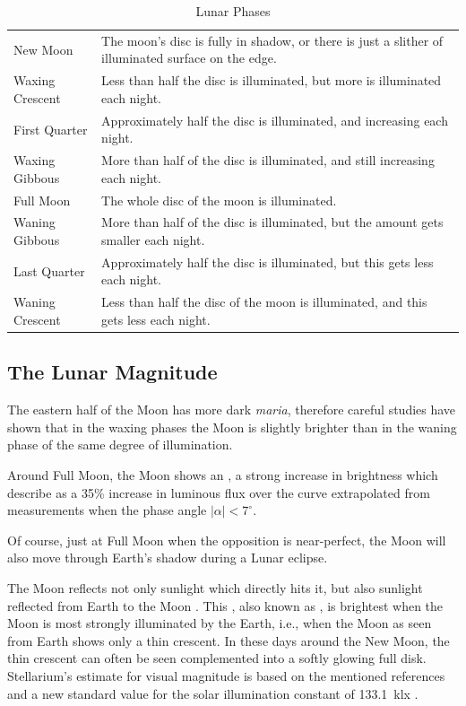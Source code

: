 \begin{table}[tb]
\small
\begin{tabularx}{\textwidth}{l|X}
\toprule
New Moon       & The moon's disc is fully in shadow, or there is just a slither of illuminated surface on the edge.\\
Waxing Crescent& Less than half the disc is illuminated, but more is illuminated each night.\\
First Quarter  & Approximately half the disc is illuminated, and increasing each night.\\
Waxing Gibbous & More than half of the disc is illuminated, and still increasing each night.\\
Full Moon      & The whole disc of the moon is illuminated.\\
Waning Gibbous & More than half of the disc is illuminated, but the amount gets smaller each night.\\
Last Quarter   & Approximately half the disc is illuminated, but this gets less each night.\\
Waning Crescent& Less than half the disc of the moon is illuminated, and this gets less each night.\\
\bottomrule
\end{tabularx}
\caption{Lunar Phases}
\label{tab:moonphases}
\end{table}

\subsection{The Lunar Magnitude}
\label{sec:Moon:magnitude}

The eastern half of the Moon has more dark \emph{maria}, therefore
careful studies \citep{Russell:1916} have shown that in the waxing
phases the Moon is slightly brighter than in the waning phase of the
same degree of illumination.

Around Full Moon, the Moon shows an , a
strong increase in brightness which \citet{Krisciunas-Schaefer:1991}
describe as a 35\% increase in luminous flux over the curve
extrapolated from measurements when the phase angle $|\alpha|<7^\circ$. 

Of course, just at Full Moon when the opposition is near-perfect, the
Moon will also move through Earth's shadow during a Lunar eclipse.

The Moon %
reflects not only sunlight
which directly hits it, but also sunlight reflected from Earth to the
Moon \citep{Agrawal:2016}. This , also known as
, is brightest when the Moon is most strongly
illuminated by the Earth, i.e., when the Moon as seen from Earth shows
only a thin crescent. In these days around the New Moon, the
thin crescent can often be seen complemented into a softly glowing
full disk.  Stellarium's estimate for visual
magnitude is based on the mentioned references and a new standard 
value for the solar illumination constant of 133.1~klx \citep{Ashdown:2019}.


